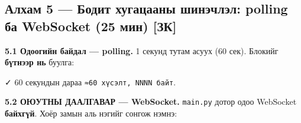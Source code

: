 \hypertarget{ux430ux43bux445ux430ux43c-5-ux431ux43eux434ux438ux442-ux445ux443ux433ux430ux446ux430ux430ux43dux44b-ux448ux438ux43dux44dux447ux43bux44dux43b-polling-ux431ux430-websocket-25-ux43cux438ux43d-ux437ux43a}{%
\subsection{Алхам 5 --- Бодит хугацааны шинэчлэл: polling ба WebSocket (25 мин) {[}ЗК{]}}\label{ux430ux43bux445ux430ux43c-5-ux431ux43eux434ux438ux442-ux445ux443ux433ux430ux446ux430ux430ux43dux44b-ux448ux438ux43dux44dux447ux43bux44dux43b-polling-ux431ux430-websocket-25-ux43cux438ux43d-ux437ux43a}}

\textbf{5.1 Одоогийн байдал --- polling.} 1 секунд тутам асуух (60 сек). Блокийг \textbf{бүтнээр нь} буулга:

\begin{Shaded}
\begin{Highlighting}[]
 \KeywordTok{|}  \StringTok{\textquotesingle{} \textquotesingle{}}  \KeywordTok{|}  
\end{Highlighting}
\end{Shaded}

✓ 60 секундын дараа \texttt{≈60\ хүсэлт,\ NNNN\ байт}.

\textbf{5.2 ОЮУТНЫ ДААЛГАВАР --- WebSocket.} \texttt{main.py} дотор одоо WebSocket \textbf{байхгүй}. Хоёр замын аль нэгийг сонгож нэмнэ:

